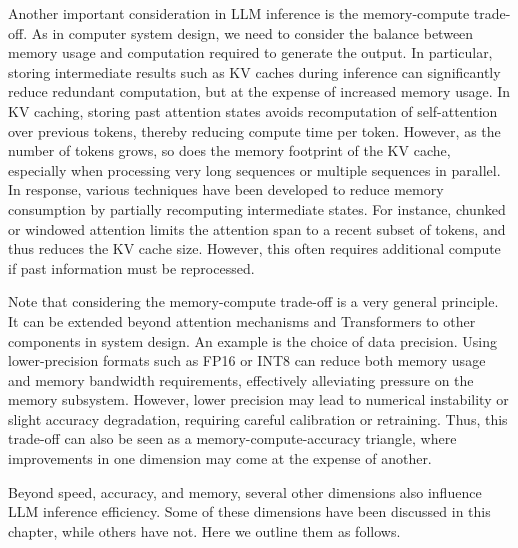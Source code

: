 Another important consideration in LLM inference is the memory-compute trade-off. As in computer system design, we need to consider the balance between memory usage and computation required to generate the output. In particular, storing intermediate results such as KV caches during inference can significantly reduce redundant computation, but at the expense of increased memory usage. In KV caching, storing past attention states avoids recomputation of self-attention over previous tokens, thereby reducing compute time per token. However, as the number of tokens grows, so does the memory footprint of the KV cache, especially when processing very long sequences or multiple sequences in parallel. In response, various techniques have been developed to reduce memory consumption by partially recomputing intermediate states. For instance, chunked or windowed attention limits the attention span to a recent subset of tokens, and thus reduces the KV cache size. However, this often requires additional compute if past information must be reprocessed.

Note that considering the memory-compute trade-off is a very general principle. It can be extended beyond attention mechanisms and Transformers to other components in system design. An example is the choice of data precision. Using lower-precision formats such as FP16 or INT8 can reduce both memory usage and memory bandwidth requirements, effectively alleviating pressure on the memory subsystem. However, lower precision may lead to numerical instability or slight accuracy degradation, requiring careful calibration or retraining. Thus, this trade-off can also be seen as a memory-compute-accuracy triangle, where improvements in one dimension may come at the expense of another.

Beyond speed, accuracy, and memory, several other dimensions also influence LLM inference efficiency. Some of these dimensions have been discussed in this chapter, while others have not. Here we outline them as follows.

